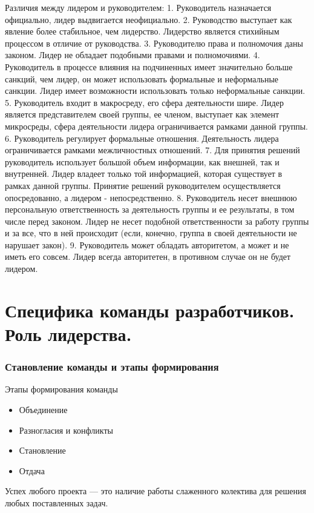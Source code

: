 \documentclass{../industrial-development}
\begin{document}
Различия между лидером и руководителем:
1. Руководитель назначается официально, лидер выдвигается неофициально.
2. Руководство выступает как явление более стабильное, чем лидерство. Лидерство является стихийным процессом в отличие от руководства.
3. Руководителю права и полномочия даны законом. Лидер не обладает подобными правами и полномочиями.
4. Руководитель в процессе влияния на подчиненных имеет значительно больше санкций, чем лидер, он может использовать формальные и неформальные санкции. Лидер имеет возможности использовать только неформальные санкции.
5. Руководитель входит в макросреду, его сфера деятельности шире. Лидер является представителем своей группы, ее членом, выступает как элемент микросреды, сфера деятельности лидера ограничивается рамками данной группы.
6. Руководитель регулирует формальные отношения. Деятельность лидера ограничивается рамками межличностных отношений.
7. Для принятия решений руководитель использует большой объем информации, как внешней, так и внутренней. Лидер владеет только той информацией, которая существует в рамках данной группы. Принятие решений руководителем осуществляется опосредованно, а лидером - непосредственно.
8. Руководитель несет внешнюю персональную ответственность за деятельность группы и ее результаты, в том числе перед законом. Лидер не несет подобной ответственности за работу группы и за все, что в ней происходит (если, конечно, группа в своей деятельности не нарушает закон).
9. Руководитель может обладать авторитетом, а может и не иметь его совсем. Лидер всегда авторитетен, в противном случае он не будет лидером.

\section{Специфика команды разработчиков. Роль лидерства.}

\begin{frame} \frametitle{Становление команды и этапы формирования}
 \begin{block}{Этапы формирования команды}
  \begin{itemize}
  \item Объединение
  \item Разногласия и конфликты
  \item Становление
  \item Отдача
  \end{itemize}
  \end{block}
 Успех любого проекта --- это наличие работы слаженного колектива для решения любых поставленных задач.\\
\end{frame}
\end{document}
